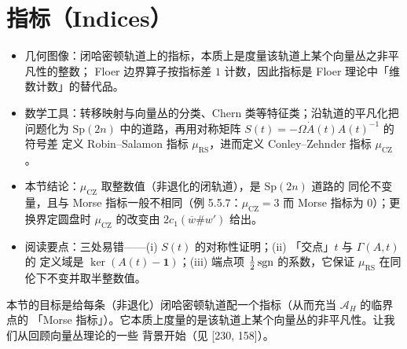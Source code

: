 
\section{指标（Indices）}

\begin{keytakeaways}
\begin{itemize}
  \item 几何图像：闭哈密顿轨道上的指标，本质上是度量该轨道上某个向量丛之非平凡性的整数；
        Floer 边界算子按指标差 $1$ 计数，因此指标是 Floer 理论中「维数计数」的替代品。
  \item 数学工具：转移映射与向量丛的分类、Chern 类等特征类；沿轨道的平凡化把问题化为
        $\mathrm{Sp}(2n)$ 中的道路，再用对称矩阵 $S(t)=-\Omega\dot A(t)A(t)^{-1}$ 的符号差
        定义 Robin--Salamon 指标 $\mu_{\mathrm{RS}}$，进而定义 Conley--Zehnder 指标
        $\mu_{\mathrm{CZ}}$。
  \item 本节结论：$\mu_{\mathrm{CZ}}$ 取整数值（非退化的闭轨道），是 $\mathrm{Sp}(2n)$ 道路的
        同伦不变量，且与 Morse 指标一般不相同（例 5.5.7：$\mu_{\mathrm{CZ}}=3$ 而 Morse 指标为
        $0$）；更换界定圆盘时 $\mu_{\mathrm{CZ}}$ 的改变由 $2c_1(\overline{w}\#w')$ 给出。
  \item 阅读要点：三处易错——(i) $S(t)$ 的对称性证明；(ii) 「交点」$t$ 与 $\Gamma(A,t)$ 的
        定义域是 $\ker(A(t)-\mathbf{1})$；(iii) 端点项 $\tfrac12\operatorname{sgn}$ 的系数，它保证 $\mu_{\mathrm{RS}}$
        在同伦下不变并取半整数值。
\end{itemize}
\end{keytakeaways}

本节的目标是给每条（非退化）闭哈密顿轨道配一个指标（从而充当 $\mathcal{A}_H$ 的临界点的
「Morse 指标」）。它本质上度量的是该轨道上某个向量丛的非平凡性。让我们从回顾向量丛理论的一些
背景开始（见 [230, 158]）。

